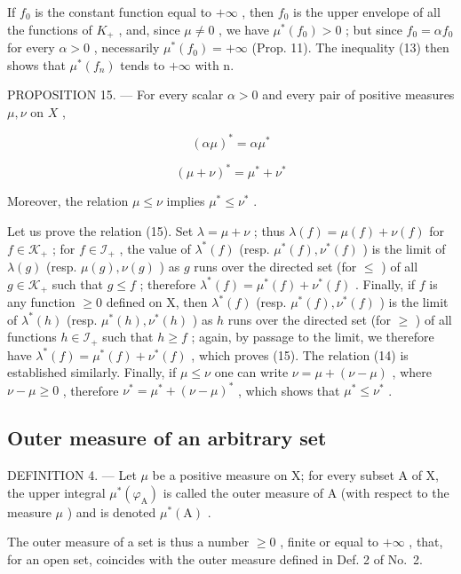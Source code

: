 If \(f_{0}\) is the constant function equal to \(+\infty\) , then \(f_{0}\) is the upper envelope of all the functions of \(K_{+}\) , and, since \(\mu \neq 0\) , we have \(\mu^{*}(f_{0}) > 0\) ; but since \(f_{0} = \alpha f_{0}\) for every \(\alpha > 0\) , necessarily \(\mu^{*}(f_{0}) = +\infty\) (Prop. 11). The inequality (13) then shows that \(\mu^{*}(f_{n})\) tends to \(+\infty\) with n.

PROPOSITION 15. --- For every scalar \(\alpha > 0\) and every pair of positive measures \(\mu, \nu\) on \(X\) ,

\[
(\alpha \mu) ^ {*} = \alpha \mu^ {*}\tag{14}
\]

\[
(\mu + \nu) ^ {*} = \mu^ {*} + \nu^ {*}\tag{15}
\]

Moreover, the relation \(\mu \leqslant \nu\) implies \(\mu^{*} \leqslant \nu^{*}\) .

Let us prove the relation (15). Set \(\lambda = \mu + \nu\) ; thus \(\lambda(f) = \mu(f) + \nu(f)\) for \(f \in \mathcal{K}_+\) ; for \(f \in \mathcal{I}_+\) , the value of \(\lambda^*(f)\) (resp. \(\mu^*(f), \nu^*(f)\) ) is the limit of \(\lambda(g)\) (resp. \(\mu(g), \nu(g)\) ) as \(g\) runs over the directed set (for \(\leqslant\) ) of all \(g \in \mathcal{K}_+\) such that \(g \leqslant f\) ; therefore \(\lambda^*(f) = \mu^*(f) + \nu^*(f)\) . Finally, if \(f\) is any function \(\geqslant 0\) defined on X, then \(\lambda^*(f)\) (resp. \(\mu^*(f), \nu^*(f)\) ) is the limit of \(\lambda^*(h)\) (resp. \(\mu^*(h), \nu^*(h)\) ) as \(h\) runs over the directed set (for \(\geqslant\) ) of all functions \(h \in \mathcal{I}_+\) such that \(h \geqslant f\) ; again, by passage to the limit, we therefore have \(\lambda^*(f) = \mu^*(f) + \nu^*(f)\) , which proves (15). The relation (14) is established similarly. Finally, if \(\mu \leqslant \nu\) one can write \(\nu = \mu + (\nu - \mu)\) , where \(\nu - \mu \geqslant 0\) , therefore \(\nu^* = \mu^* + (\nu - \mu)^*\) , which shows that \(\mu^* \leqslant \nu^*\) .

\subsection{Outer measure of an arbitrary set}

DEFINITION 4. --- Let \(\mu\) be a positive measure on X; for every subset A of X, the upper integral \(\mu^{*}(\varphi_{\mathrm{A}})\) is called the outer measure of A (with respect to the measure \(\mu\) ) and is denoted \(\mu^{*}(\mathrm{A})\) .

The outer measure of a set is thus a number \(\geqslant0\) , finite or equal to \(+\infty\) , that, for an open set, coincides with the outer measure defined in Def. 2 of No.~2.

